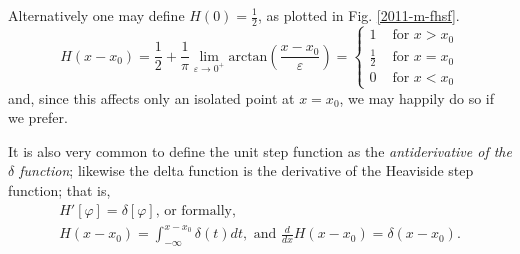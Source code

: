Alternatively one may define $H(0)=\frac{1}{2}$, as plotted in Fig. \ref{2011-m-fhsf}.
\begin{equation}
H(x-x_0)
=   \frac{1}{2} + \frac{1}{\pi } \lim_{\varepsilon \rightarrow 0^+} \textrm{arctan}\left( \frac{x-x_0}{\varepsilon} \right)
=
\left\{
\begin{array}{rl}
1&\textrm{ for } x > x_0\\
\frac{1}{2}&\textrm{ for } x = x_0\\
0&\textrm{ for } x < x_0
\end{array}
\right.
\label{2012-m-di-hsfoh}
\end{equation}
and, since this affects only an isolated point at $x=x_0$, we may happily do so if we prefer.

It is also very common to define the  unit step function as the
{\em antiderivative  of the $\delta$ function};
likewise the delta function is the derivative of the Heaviside step function; that is,
\begin{equation}
\begin{split}
H'[\varphi ]=\delta [\varphi ]\text{, or formally,}\\
H(x-x_0)
=
\int_{-\infty}^{x-x_0} \delta (t) dt,\text{ and }
\frac{d}{dx} H(x-x_0)=\delta (x-x_0).
\end{split}
\end{equation}

